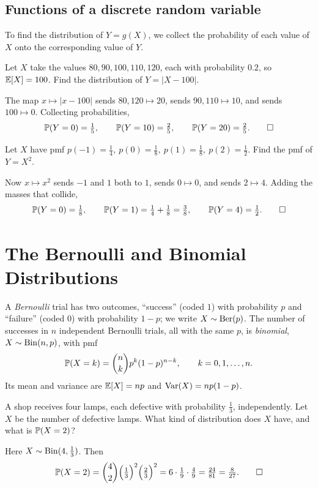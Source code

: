 \subsection{Functions of a discrete random variable}

To find the distribution of $Y=g(X)$, we collect the probability of each value
of $X$ onto the corresponding value of $Y$.

\begin{example}
Let $X$ take the values $80,90,100,110,120$, each with probability $0.2$, so
$\mathbb{E}[X]=100$. Find the distribution of $Y=|X-100|$.

\solution The map $x\mapsto|x-100|$ sends $80,120\mapsto 20$, sends
$90,110\mapsto 10$, and sends $100\mapsto 0$. Collecting probabilities,
\[
  \mathbb{P}(Y=0)=\tfrac15,\qquad \mathbb{P}(Y=10)=\tfrac25,\qquad \mathbb{P}(Y=20)=\tfrac25. \qedhere
\]
\end{example}

\begin{example}
Let $X$ have pmf $p(-1)=\tfrac14,\ p(0)=\tfrac18,\ p(1)=\tfrac18,\ p(2)=\tfrac12$.
Find the pmf of $Y=X^2$.

\solution Now $x\mapsto x^2$ sends $-1$ and $1$ both to $1$, sends $0\mapsto 0$,
and sends $2\mapsto 4$. Adding the masses that collide,
\[
  \mathbb{P}(Y=0)=\tfrac18,\qquad
  \mathbb{P}(Y=1)=\tfrac14+\tfrac18=\tfrac38,\qquad
  \mathbb{P}(Y=4)=\tfrac12. \qedhere
\]
\end{example}

\section{The Bernoulli and Binomial Distributions}

A \emph{Bernoulli} trial has two outcomes, ``success'' (coded $1$) with
probability $p$ and ``failure'' (coded $0$) with probability $1-p$; we write
$X\sim\mathrm{Ber}(p)$. The number of successes in $n$ independent Bernoulli trials, all
with the same $p$, is \emph{binomial}, $X\sim\mathrm{Bin}(n,p)$, with pmf
\[
  \mathbb{P}(X=k)=\binom{n}{k}p^k(1-p)^{n-k},\qquad k=0,1,\dots,n.
\]
Its mean and variance are $\mathbb{E}[X]=np$ and $\mathrm{Var}(X)=np(1-p)$.

\begin{example}
A shop receives four lamps, each defective with probability $\tfrac13$,
independently. Let $X$ be the number of defective lamps. What kind of
distribution does $X$ have, and what is $\mathbb{P}(X=2)$?

\solution Here $X\sim\mathrm{Bin}(4,\tfrac13)$. Then
\[
  \mathbb{P}(X=2)=\binom{4}{2}\Bigl(\tfrac13\Bigr)^2\Bigl(\tfrac23\Bigr)^2
   =6\cdot\tfrac19\cdot\tfrac49=\tfrac{24}{81}=\tfrac{8}{27}. \qedhere
\]
\end{example}

